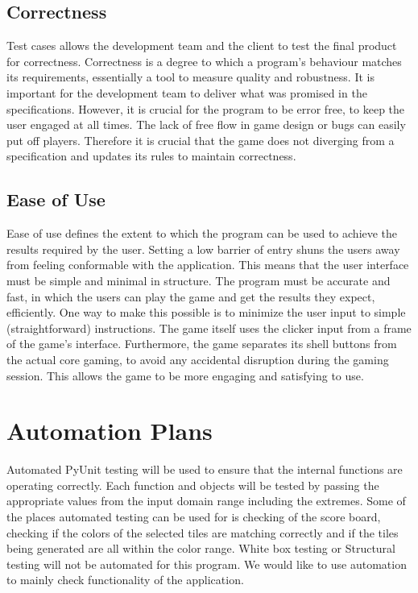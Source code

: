 \documentclass[12pt]{article}
\begin{document}
\subsection{Correctness}
Test cases allows the development team and the client to test the final product for correctness. Correctness is a degree to which a program’s behaviour matches its requirements, essentially a tool to measure quality and robustness. It is important for the development team to deliver what was promised in the specifications. However, it is crucial for the program to be error free, to keep the user engaged at all times. The lack of free flow in game design or bugs can easily put off players. Therefore it is crucial that the game does not diverging from a specification and updates its rules to maintain correctness. 


\subsection{Ease of Use}
Ease of use defines the extent to which the program can be used to achieve the results required by the user. Setting a low barrier of entry shuns the users away from feeling conformable with the application. This means that the user interface must be simple and minimal in structure. The program must be accurate and fast, in which the users can play the game and get the results they expect, efficiently. 
One way to make this possible is to minimize the user input to simple (straightforward) instructions. The game itself uses the clicker input from a frame of the game's interface. Furthermore, the game separates its shell buttons from the actual core gaming, to avoid any accidental disruption during the gaming session.  This allows the game to be more engaging and satisfying to use.  

%
%

\section{Automation Plans}
Automated PyUnit testing will be used to ensure that the internal functions are operating correctly. Each function and objects will be tested by passing the appropriate values from the input domain range including the extremes. Some of the places automated testing can be used for is checking of the score board, checking if the colors of the selected tiles are matching correctly and if the tiles being generated are all within the color range. White box testing or Structural testing will not be automated for this program. We would like to use automation to mainly check functionality of the application. 
\end{document}

